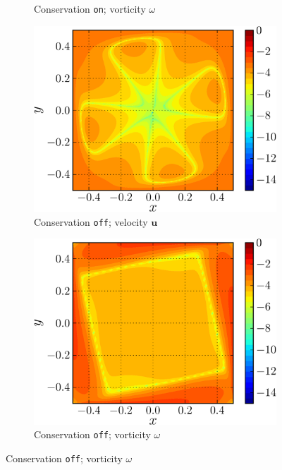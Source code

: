 \begin{figure}[!b]
\begin{subfigure}[t]{0.45\textwidth}
             \caption{Conservation \texttt{on}; vorticity $\omega$}
             \label{fig:lambOseen_fullyCon_wErrorFinal}
     \end{subfigure}%
            
     \begin{subfigure}[t]{0.45\textwidth}
             \includegraphics[width=\linewidth]{./figures/validation/lambOseent2/lambOseen_fullyCoff_vErrorFinal_compressed-crop.png}
             \caption{Conservation \texttt{off}; velocity $\mathbf{u}$}
             \label{fig:lambOseen_fullyCoff_vErrorFinal}
     \end{subfigure}
     \qquad     
     \begin{subfigure}[t]{0.45\textwidth}
             \includegraphics[width=\linewidth]{./figures/validation/lambOseent2/lambOseen_fullyCoff_wErrorFinal_compressed-crop.png}
             \caption{Conservation \texttt{off}; vorticity $\omega$}
             \label{fig:lambOseen_fullyCoff_wErrorFinal}
     \end{subfigure}  
  

\end{figure}
